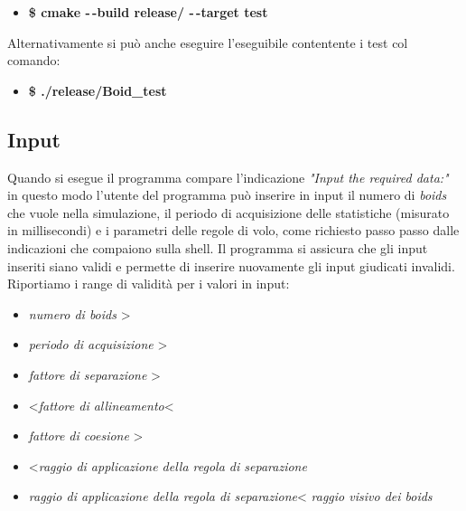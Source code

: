 \documentclass{article}
\begin{document}
\begin{itemize}
    \item \textbf{\$ cmake -\,-build release/ -\,-target test}
\end{itemize}

\begin{flushleft}
    Alternativamente si può anche eseguire l'eseguibile contentente i test col 
    comando:
\end{flushleft}

\begin{itemize}
    \item \textbf{\$ ./release/Boid\_test}
\end{itemize}




\subsection{Input}

Quando si esegue il programma compare l'indicazione \textit{"Input the required 
data:"} in questo modo l'utente del programma può inserire in input il numero di
\textit{boids} che vuole nella simulazione, il periodo di acquisizione delle 
statistiche (misurato in millisecondi) e i parametri delle regole di volo, come 
richiesto passo passo dalle indicazioni che compaiono sulla shell. Il programma 
si assicura che gli input inseriti siano validi e permette di inserire 
nuovamente gli input giudicati invalidi. Riportiamo i range di validità per i 
valori in input:

\begin{itemize}
\item \:\textit{numero di boids} \textgreater{} 
\item  \:\textit{periodo di acquisizione} \textgreater{} 
\item  \:\textit{fattore di separazione} \textgreater{}  
\item  {}\;\textless\;\textit{fattore di allineamento}\;\textless{}  
\item  \:\textit{fattore di coesione} \textgreater{}  
\item  {}\;\textless\;\textit{raggio di applicazione della regola di 
        separazione}
\item \:\textit{raggio di applicazione della regola di separazione}\;\textless\;
        \textit{raggio visivo dei boids}
\end{itemize}
\end{document}

